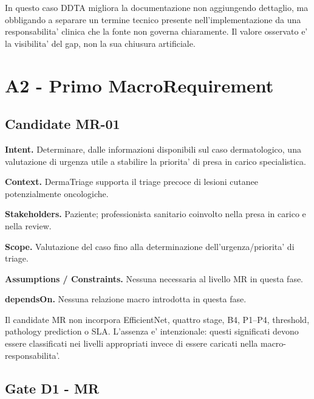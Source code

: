 \documentclass[11pt,a4paper]{article}
\begin{document}
\begin{ddtaprinciple}[title={Osservazione metodologica 01}]
In questo caso DDTA migliora la documentazione non aggiungendo dettaglio, ma obbligando a separare un termine tecnico presente nell'implementazione da una responsabilita' clinica che la fonte non governa chiaramente. Il valore osservato e' la visibilita' del gap, non la sua chiusura artificiale.
\end{ddtaprinciple}

\section{A2 - Primo MacroRequirement}

\subsection{Candidate MR-01}

\begin{ddtacore}[title={MR-01 - Valutazione di triage del caso dermatologico}]
\textbf{Intent.} Determinare, dalle informazioni disponibili sul caso dermatologico, una valutazione di urgenza utile a stabilire la priorita' di presa in carico specialistica.

\textbf{Context.} DermaTriage supporta il triage precoce di lesioni cutanee potenzialmente oncologiche.

\textbf{Stakeholders.} Paziente; professionista sanitario coinvolto nella presa in carico e nella review.

\textbf{Scope.} Valutazione del caso fino alla determinazione dell'urgenza/priorita' di triage.

\textbf{Assumptions / Constraints.} Nessuna necessaria al livello MR in questa fase.

\textbf{dependsOn.} Nessuna relazione macro introdotta in questa fase.
\end{ddtacore}

Il candidate MR non incorpora EfficientNet, quattro stage, B4, P1--P4, threshold, pathology prediction o SLA. L'assenza e' intenzionale: questi significati devono essere classificati nei livelli appropriati invece di essere caricati nella macro-responsabilita'.

\subsection{Gate D1 - MR}
\end{document}
